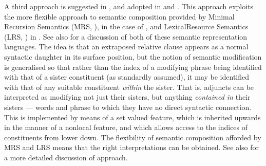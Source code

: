 \documentclass[output=paper,biblatex,babelshorthands,newtxmath,draftmode,colorlinks,citecolor=brown]{langscibook}
\begin{document}
\indexmrsstart
\indexlrsstart
A third approach is suggested in , and adopted in  and
. This approach exploits the more flexible approach to semantic composition provided by Minimal
  Recursion Semantics (MRS, \citealt{CFPS2005a}), in the case of , and
Lexical\indexlrs Resource Semantics (LRS, \citealt{richtersailer-lrs04}) in
. See also  for a discussion of both of these
  semantic representation languages. The idea is
that an extraposed relative clause appears as a normal syntactic daughter in its surface
position, but the notion of semantic modification is generalised so that rather than the
index of a modifying phrase being identified with that of a sister constituent (as
standardly assumed), it may be identified with that of any suitable constituent
\emph{within} the sister. That is, adjuncts can be interpreted as modifying not just their sisters, but
anything \emph{contained in} their sisters --- words and phrase to which they have no
direct syntactic connection.  This is implemented by means of a set valued
 feature, which is inherited upwards in the manner of a nonlocal
feature, and which allows access to the indices of constituents from lower down. The
flexibility of semantic composition afforded by MRS and LRS means that the right
interpretations can be obtained. See also
 for a more detailed
discussion of  approach.
\indexmrsend
\indexlrsend
\end{document}
